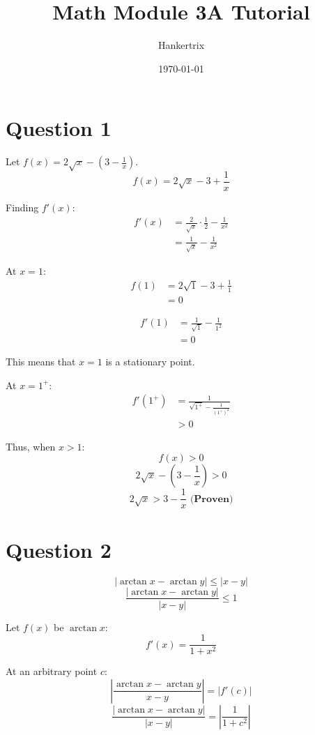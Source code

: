 \documentclass[11pt]{article}
\author{Hankertrix}
\date{\today}
\title{Math Module 3A Tutorial}
\begin{document}
\maketitle
\setcounter{tocdepth}{2}
\tableofcontents

\newpage

\section{Question 1}
\label{sec:org4a02a0d}

Let \(f(x) = 2\sqrt{x} - (3 - \frac{1}{x})\).
\[f(x) = 2\sqrt{x} - 3 + \frac{1}{x}\]

Finding \(f'(x)\):
\begin{align*}
f'(x) &= \frac{2}{\sqrt{x}} \cdot \frac{1}{2} - \frac{1}{x^2} \\
&= \frac{1}{\sqrt{x}} - \frac{1}{x^2}
\end{align*}

At \(x = 1\):
\begin{align*}
f(1) &= 2 \sqrt{1} - 3 + \frac{1}{1} \\
&= 0
\end{align*}

\begin{align*}
f'(1) &= \frac{1}{\sqrt{1}} - \frac{1}{1^2} \\
&= 0
\end{align*}

This means that \(x = 1\) is a stationary point.

At \(x = 1^+\):
\begin{align*}
f'(1^+) &= \frac{1}{\sqrt{1^+} - \frac{1}{(1^+)^2}} \\
&> 0
\end{align*}

Thus, when \(x > 1\):
\[f(x) > 0\]
\[2 \sqrt{x} - (3 - \frac{1}{x}) > 0\]
\[2 \sqrt{x} > 3 - \frac{1}{x} \textbf{ (Proven)}\]


\section{Question 2}
\label{sec:org96c1805}

\[|\arctan x - \arctan y| \le | x - y |\]
\[\frac{|\arctan x - \arctan y|}{| x - y |} \le 1\]

Let \(f(x)\) be \(\arctan x\):
\[f'(x) = \frac{1}{1 + x^2}\]

At an arbitrary point \(c\):
\[\left|\frac{\arctan x - \arctan y}{x - y}\right| = |f'(c)|\]
\[\frac{|\arctan x - \arctan y|}{|x - y|} = \left|\frac{1}{1 + c^2}\right|\]
\end{document}
